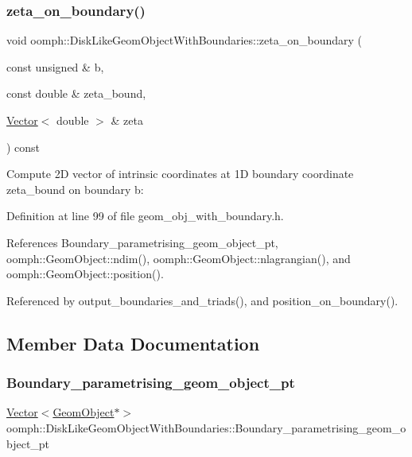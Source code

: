 \subsubsection{\texorpdfstring{zeta\+\_\+on\+\_\+boundary()}{zeta\_on\_boundary()}}
{\footnotesize\ttfamily void oomph\+::\+Disk\+Like\+Geom\+Object\+With\+Boundaries\+::zeta\+\_\+on\+\_\+boundary (\begin{DoxyParamCaption}\item[{const unsigned \&}]{b,  }\item[{const double \&}]{zeta\+\_\+bound,  }\item[{\hyperlink{classoomph_1_1Vector}{Vector}$<$ double $>$ \&}]{zeta }\end{DoxyParamCaption}) const\hspace{0.3cm}{\ttfamily [inline]}}



Compute 2D vector of intrinsic coordinates at 1D boundary coordinate zeta\+\_\+bound on boundary b\+: 



Definition at line 99 of file geom\+\_\+obj\+\_\+with\+\_\+boundary.\+h.



References Boundary\+\_\+parametrising\+\_\+geom\+\_\+object\+\_\+pt, oomph\+::\+Geom\+Object\+::ndim(), oomph\+::\+Geom\+Object\+::nlagrangian(), and oomph\+::\+Geom\+Object\+::position().



Referenced by output\+\_\+boundaries\+\_\+and\+\_\+triads(), and position\+\_\+on\+\_\+boundary().



\subsection{Member Data Documentation}
\mbox{\label{classoomph_1_1DiskLikeGeomObjectWithBoundaries_aa1de5b0b7af8d20c3675ae9b4b6f2e12}} 
\subsubsection{\texorpdfstring{Boundary\+\_\+parametrising\+\_\+geom\+\_\+object\+\_\+pt}{Boundary\_parametrising\_geom\_object\_pt}}
{\footnotesize\ttfamily \hyperlink{classoomph_1_1Vector}{Vector}$<$\hyperlink{classoomph_1_1GeomObject}{Geom\+Object}$\ast$$>$ oomph\+::\+Disk\+Like\+Geom\+Object\+With\+Boundaries\+::\+Boundary\+\_\+parametrising\+\_\+geom\+\_\+object\+\_\+pt\hspace{0.3cm}{\ttfamily [protected]}}



